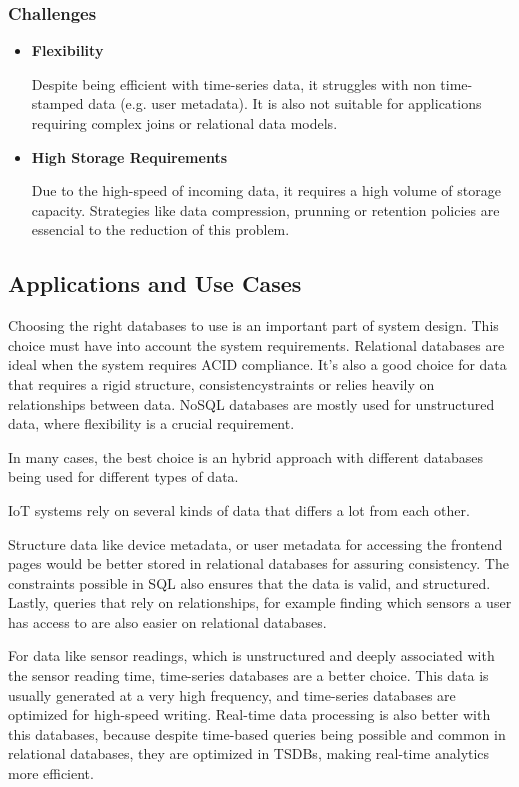 \subsubsection{Challenges}

\begin{itemize}

	\item \textbf{Flexibility}

	      Despite being efficient with time-series data, it struggles with non
	      time-stamped data (e.g. user metadata). It is also not suitable for applications requiring
	      complex joins or relational data models.

	\item \textbf{High Storage Requirements}

	      Due to the high-speed of incoming data, it requires a high volume of storage
	      capacity. Strategies like data compression, prunning or retention policies
	      are essencial to the reduction of this problem.

\end{itemize}
\subsection{Applications and Use Cases}
Choosing the right databases to use is an important part of system design. This
choice must have into account the system requirements. Relational databases are
ideal when the system requires \gls{ACID} compliance. It's also a good choice for
data that requires a rigid structure, consistencystraints or relies heavily on
relationships between data. \gls{NoSQL} databases are mostly used for unstructured
data, where flexibility is a crucial requirement.

In many cases, the best choice is an hybrid approach with different databases
being used for different types of data.

\gls{IoT} systems rely on several kinds of data that differs a lot from each other.

Structure data like device metadata, or user metadata for accessing the
frontend pages would be better stored in relational databases for assuring
consistency. The constraints possible in \gls{SQL} also ensures that the data is valid,
and structured. Lastly, queries that rely on relationships, for example finding
which sensors a user has access to are also easier on relational databases.

For data like sensor readings, which is unstructured and deeply associated with
the sensor reading time, time-series databases are a better choice. This data
is usually generated at a very high frequency, and time-series databases are
optimized for high-speed writing. Real-time data processing is also better with
this databases, because despite time-based queries being possible and common in
relational databases, they are optimized in \gls{TSDB}s, making
real-time analytics more efficient.

